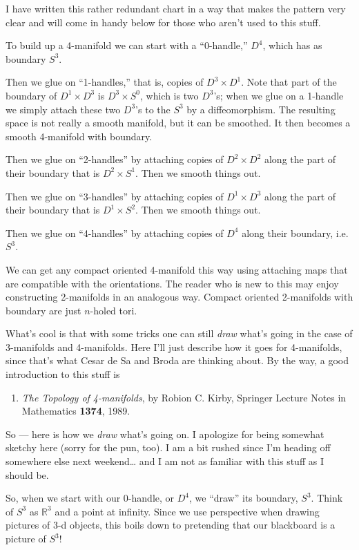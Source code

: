 \documentclass[12pt]{article}
\begin{document}
I have written this rather redundant chart in a way that makes the
pattern very clear and will come in handy below for those who aren't
used to this stuff.

To build up a 4-manifold we can start with a ``0-handle,'' \(D^4\),
which has as boundary \(S^3\).

Then we glue on ``1-handles,'' that is, copies of \(D^3 \times D^1\).
Note that part of the boundary of \(D^1 \times D^3\) is
\(D^3 \times S^0\), which is two \(D^3\)'s; when we glue on a 1-handle
we simply attach these two \(D^3\)'s to the \(S^3\) by a diffeomorphism.
The resulting space is not really a smooth manifold, but it can be
smoothed. It then becomes a smooth 4-manifold with boundary.

Then we glue on ``2-handles'' by attaching copies of \(D^2 \times D^2\)
along the part of their boundary that is \(D^2 \times S^1\). Then we
smooth things out.

Then we glue on ``3-handles'' by attaching copies of \(D^1 \times D^3\)
along the part of their boundary that is \(D^1 \times S^2\). Then we
smooth things out.

Then we glue on ``4-handles'' by attaching copies of \(D^4\) along their
boundary, i.e.~\(S^3\).

We can get any compact oriented 4-manifold this way using attaching maps
that are compatible with the orientations. The reader who is new to this
may enjoy constructing 2-manifolds in an analogous way. Compact oriented
2-manifolds with boundary are just \(n\)-holed tori.

What's cool is that with some tricks one can still \emph{draw} what's
going in the case of 3-manifolds and 4-manifolds. Here I'll just
describe how it goes for 4-manifolds, since that's what Cesar de Sa and
Broda are thinking about. By the way, a good introduction to this stuff
is

\begin{enumerate}
\def\labelenumi{\arabic{enumi})}
\setcounter{enumi}{3}
\item
\emph{The Topology of 4-manifolds}, by Robion C. Kirby, Springer
Lecture Notes in Mathematics \textbf{1374}, 1989.
\end{enumerate}
\noindent
So --- here is how we \emph{draw} what's going on. I apologize for being
somewhat sketchy here (sorry for the pun, too). I am a bit rushed since
I'm heading off somewhere else next weekend\ldots{} and I am not as
familiar with this stuff as I should be.

So, when we start with our 0-handle, or \(D^4\), we ``draw'' its
boundary, \(S^3\). Think of \(S^3\) as \(\mathbb{R}^3\) and a point at
infinity. Since we use perspective when drawing pictures of 3-d objects,
this boils down to pretending that our blackboard is a picture of
\(S^3\)!
\end{document}
